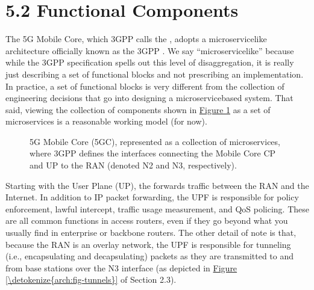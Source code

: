 \documentclass[a4paper,11pt,english]{sphinxmanual}
\let\sphinxpxdimen\pdfpxdimen\else\newdimen\sphinxpxdimen
\begin{document}
\section{5.2 Functional Components}
\label{\detokenize{core:functional-components}}
\sphinxAtStartPar
The 5G Mobile Core, which 3GPP calls the , adopts a
microservice\sphinxhyphen{}like architecture officially known as the 3GPP .  We say “microservice\sphinxhyphen{}like” because while the
3GPP specification spells out this level of disaggregation, it is
really just describing a set of functional blocks and not prescribing
an implementation. In practice, a set of functional blocks is very
different from the collection of engineering decisions that go into
designing a microservice\sphinxhyphen{}based system. That said, viewing the
collection of components shown in \hyperref[\detokenize{core:fig-5g-core}]{Figure \ref{\detokenize{core:fig-5g-core}}} as
a set of microservices is a reasonable working model (for now).

\begin{figure}[ht]
\centering
\capstart

\noindent\sphinxincludegraphics[width=700\sphinxpxdimen]{{Slide211}.png}
\caption{5G Mobile Core (5GC), represented as a collection of
microservices, where 3GPP defines the interfaces connecting the
Mobile Core CP and UP to the RAN (denoted N2 and N3, respectively).}\label{\detokenize{core:id3}}\label{\detokenize{core:fig-5g-core}}\end{figure}

\sphinxAtStartPar
Starting with the User Plane (UP), the 
forwards traffic between the RAN and the Internet. In addition to IP
packet forwarding, the UPF is responsible for policy enforcement,
lawful intercept, traffic usage measurement, and QoS policing. These
are all common functions in access routers, even if they go beyond
what you usually find in enterprise or backbone routers. The other
detail of note is that, because the RAN is an overlay network, the UPF
is responsible for tunneling (i.e., encapsulating and decapsulating)
packets as they are transmitted to and from base stations over the N3
interface (as depicted in \hyperref[\detokenize{arch:fig-tunnels}]{Figure
\ref{\detokenize{arch:fig-tunnels}}} of Section 2.3).
\end{document}
